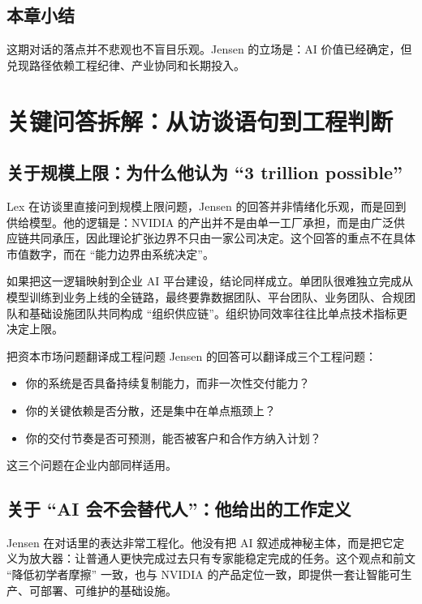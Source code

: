 \documentclass[a4paper]{article}
\begin{document}
\subsection{本章小结}

这期对话的落点并不悲观也不盲目乐观。Jensen 的立场是：AI 价值已经确定，但兑现路径依赖工程纪律、产业协同和长期投入。

\section{关键问答拆解：从访谈语句到工程判断}

\subsection{关于规模上限：为什么他认为 ``3 trillion possible''}

Lex 在访谈里直接问到规模上限问题，Jensen 的回答并非情绪化乐观，而是回到供给模型。他的逻辑是：NVIDIA 的产出并不是由单一工厂承担，而是由广泛供应链共同承压，因此理论扩张边界不只由一家公司决定。这个回答的重点不在具体市值数字，而在 ``能力边界由系统决定''。

如果把这一逻辑映射到企业 AI 平台建设，结论同样成立。单团队很难独立完成从模型训练到业务上线的全链路，最终要靠数据团队、平台团队、业务团队、合规团队和基础设施团队共同构成 ``组织供应链''。组织协同效率往往比单点技术指标更决定上限。

\begin{knowledgebox}{把资本市场问题翻译成工程问题}
Jensen 的回答可以翻译成三个工程问题：
\begin{itemize}
    \item 你的系统是否具备持续复制能力，而非一次性交付能力？
    \item 你的关键依赖是否分散，还是集中在单点瓶颈上？
    \item 你的交付节奏是否可预测，能否被客户和合作方纳入计划？
\end{itemize}
这三个问题在企业内部同样适用。
\end{knowledgebox}

\subsection{关于 ``AI 会不会替代人''：他给出的工作定义}

Jensen 在对话里的表达非常工程化。他没有把 AI 叙述成神秘主体，而是把它定义为放大器：让普通人更快完成过去只有专家能稳定完成的任务。这个观点和前文 ``降低初学者摩擦'' 一致，也与 NVIDIA 的产品定位一致，即提供一套让智能可生产、可部署、可维护的基础设施。
\end{document}
